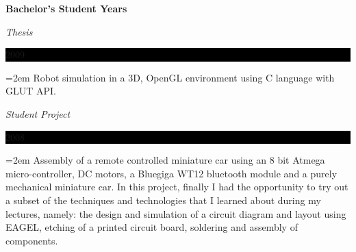 \documentclass[paper=a4,fontsize=11pt]{scrartcl}	 			%
\newlength{\spacebox}
\newcommand{\sepspace}{\vspace*{0.75em}}			%
\newcommand{\NewPart}[1]{\section*{\uppercase{#1}}}
\newcommand{\PersonalEntry}[2]{
		\noindent\hangindent=2em\hangafter=0 		%
		\parbox{\spacebox}{						%
		\textit{#1}}								%
		\hspace{1.5em} #2 \par}					%
\newcommand{\SkillsEntry}[2]{						%
		\noindent\hangindent=2em\hangafter=0 		%
		\parbox{\spacebox}{						%
		\textit{#1}}								%
		\hspace{1.5em} #2 \par}					%
\newcommand{\EducationEntry}[4]{
		\noindent \textbf{#1} \par 					%
		\noindent \textit{#3} \hfill					%
		\colorbox{Black}{%
			\parbox{6em}{%
			\hfill\color{White}#2}} \par				%
		\noindent\hangindent=2em\hangafter=0 \small #4 	%
		\normalsize \par}
\begin{document}
\sepspace
\EducationEntry{Bachelor's Student Years}{2009}{Thesis}{Robot simulation in a 3D, OpenGL environment using C language with GLUT API.}
\EducationEntry{}{2008}{Student Project}{Assembly of a remote controlled miniature car using an 8 bit Atmega micro-controller, DC motors, a Bluegiga WT12 bluetooth module and a purely mechanical miniature car. In this project, finally I had the opportunity to try out a subset of the techniques and technologies that I learned about during my lectures, namely: the design and simulation of a circuit diagram and layout using EAGEL, etching of a printed circuit board, soldering and assembly of components.}


\end{document}
